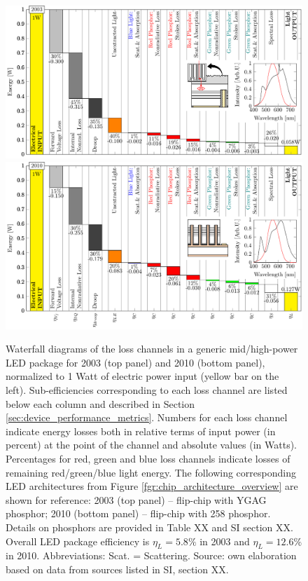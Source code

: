 \documentclass[twoside,twocolumn,9pt]{article}
\begin{document}
\begin{figure}[h!]
 \centering
 \includegraphics[width=16.5cm]{2_SSL_EES/article/figures/waterfall_performance_2003.pdf}
 \includegraphics[width=16.5cm]{2_SSL_EES/article/figures/waterfall_performance_2010.pdf}
 \caption{Waterfall diagrams of the loss channels in a generic mid/high-power LED package for 2003 (top panel) and 2010 (bottom panel), normalized to 1 Watt of electric power input (yellow bar on the left). Sub-efficiencies corresponding to each loss channel are listed below each column and described in Section \ref{sec:device_performance_metrics}. Numbers for each loss channel indicate energy losses both in relative terms of input power (in percent) at the point of the channel and absolute values (in Watts). Percentages for red, green and blue loss channels indicate losses of remaining red/green/blue light energy. The following corresponding LED architectures from Figure \ref{fgr:chip_architecture_overview} are shown for reference: 2003 (top panel) – flip-chip with YGAG phosphor; 2010 (bottom panel) – flip-chip with 258 phosphor. Details on phosphors are provided in Table XX and SI section XX. Overall LED package efficiency is $\eta_L = 5.8\%$ in 2003 and $\eta_L = 12.6\%$ in 2010. Abbreviations: Scat. = Scattering. Source: own elaboration based on data from sources listed in SI, section XX.}
 \label{fgr:waterfall_1}
\end{figure}
\end{document}
